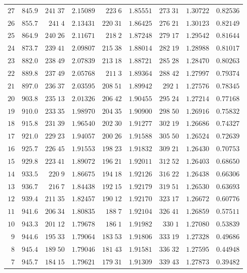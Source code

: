 \begin{center}
\begin{tabular}{r|r|r|r|r|r|r|r|r}
$27$&$845.9$&$241\;37$&$2.15089$&$223\;6$&$1.85551$&$273\;31$&$1.30722$&$0.82536$\\
$26$&$855.7$&$241\;4$&$2.13431$&$220\;31$&$1.86425$&$276\;21$&$1.30123$&$0.82149$\\[2pt]
$25$&$864.9$&$240\;26$&$2.11671$&$218\;2$&$1.87248$&$279\;17$&$1.29542$&$0.81644$\\
$24$&$873.7$&$239\;41$&$2.09807$&$215\;38$&$1.88014$&$282\;19$&$1.28988$&$0.81017$\\
$23$&$882.0$&$238\;49$&$2.07839$&$213\;18$&$1.88721$&$285\;28$&$1.28470$&$0.80263$\\
$22$&$889.8$&$237\;49$&$2.05768$&$211\;3$&$1.89364$&$288\;42$&$1.27997$&$0.79374$\\
$21$&$897.0$&$236\;37$&$2.03595$&$208\;51$&$1.89942$&$292\;1$&$1.27576$&$0.78345$\\[2pt]
$20$&$903.8$&$235\;13$&$2.01326$&$206\;42$&$1.90455$&$295\;24$&$1.27214$&$0.77168$\\
$19$&$910.0$&$233\;35$&$1.98970$&$204\;35$&$1.90900$&$298\;50$&$1.26916$&$0.75832$\\
$18$&$915.8$&$231\;39$&$1.96540$&$202\;30$&$1.91277$&$302\;19$&$1.26686$&$0.74327$\\
$17$&$921.0$&$229\;23$&$1.94057$&$200\;26$&$1.91588$&$305\;50$&$1.26524$&$0.72639$\\
$16$&$925.7$&$226\;45$&$1.91553$&$198\;23$&$1.91832$&$309\;21$&$1.26430$&$0.70753$\\[2pt]
$15$&$929.8$&$223\;41$&$1.89072$&$196\;21$&$1.92011$&$312\;52$&$1.26403$&$0.68650$\\
$14$&$933.5$&$220\;9$&$1.86675$&$194\;18$&$1.92126$&$316\;22$&$1.26438$&$0.66306$\\
$13$&$936.7$&$216\;7$&$1.84438$&$192\;15$&$1.92179$&$319\;51$&$1.26530$&$0.63693$\\
$12$&$939.4$&$211\;35$&$1.82457$&$190\;12$&$1.92170$&$323\;17$&$1.26672$&$0.60776$\\
$11$&$941.6$&$206\;34$&$1.80835$&$188\;7$&$1.92104$&$326\;41$&$1.26859$&$0.57511$\\[2pt]
$10$&$943.3$&$201\;12$&$1.79678$&$186\;1$&$1.91982$&$330\;1$&$1.27080$&$0.53839$\\
$9$&$944.6$&$195\;33$&$1.79064$&$183\;53$&$1.91806$&$333\;19$&$1.27328$&$0.49686$\\
$8$&$945.4$&$189\;50$&$1.79046$&$181\;43$&$1.91581$&$336\;32$&$1.27595$&$0.44948$\\
$7$&$945.7$&$184\;15$&$1.79621$&$179\;31$&$1.91309$&$339\;43$&$1.27873$&$0.39482$\\

\end{tabular}
\end{center}
